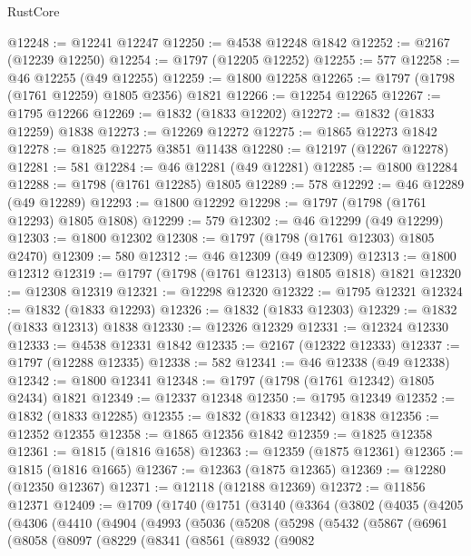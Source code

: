 \begin{lexlean}{RustCore}
\begin{coremodule}
@12248 := @12241 @12247
@12250 := @4538 @12248 @1842
@12252 := @2167 (@12239 @12250)
@12254 := @1797 (@12205 @12252)
@12255 := 577
@12258 := @46 @12255 (@49 @12255)
@12259 := @1800 @12258
@12265 := @1797 (@1798 (@1761 @12259) @1805 @2356) @1821
@12266 := @12254 @12265
@12267 := @1795 @12266
@12269 := @1832 (@1833 @12202)
@12272 := @1832 (@1833 @12259) @1838
@12273 := @12269 @12272
@12275 := @1865 @12273 @1842
@12278 := @1825 @12275 @3851 @11438
@12280 := @12197 (@12267 @12278)
@12281 := 581
@12284 := @46 @12281 (@49 @12281)
@12285 := @1800 @12284
@12288 := @1798 (@1761 @12285) @1805
@12289 := 578
@12292 := @46 @12289 (@49 @12289)
@12293 := @1800 @12292
@12298 := @1797 (@1798 (@1761 @12293) @1805 @1808)
@12299 := 579
@12302 := @46 @12299 (@49 @12299)
@12303 := @1800 @12302
@12308 := @1797 (@1798 (@1761 @12303) @1805 @2470)
@12309 := 580
@12312 := @46 @12309 (@49 @12309)
@12313 := @1800 @12312
@12319 := @1797 (@1798 (@1761 @12313) @1805 @1818) @1821
@12320 := @12308 @12319
@12321 := @12298 @12320
@12322 := @1795 @12321
@12324 := @1832 (@1833 @12293)
@12326 := @1832 (@1833 @12303)
@12329 := @1832 (@1833 @12313) @1838
@12330 := @12326 @12329
@12331 := @12324 @12330
@12333 := @4538 @12331 @1842
@12335 := @2167 (@12322 @12333)
@12337 := @1797 (@12288 @12335)
@12338 := 582
@12341 := @46 @12338 (@49 @12338)
@12342 := @1800 @12341
@12348 := @1797 (@1798 (@1761 @12342) @1805 @2434) @1821
@12349 := @12337 @12348
@12350 := @1795 @12349
@12352 := @1832 (@1833 @12285)
@12355 := @1832 (@1833 @12342) @1838
@12356 := @12352 @12355
@12358 := @1865 @12356 @1842
@12359 := @1825 @12358
@12361 := @1815 (@1816 @1658)
@12363 := @12359 (@1875 @12361)
@12365 := @1815 (@1816 @1665)
@12367 := @12363 (@1875 @12365)
@12369 := @12280 (@12350 @12367)
@12371 := @12118 (@12188 @12369)
@12372 := @11856 @12371
@12409 := @1709
    (@1740
      (@1751
        (@3140
          (@3364
            (@3802
              (@4035
                (@4205
                  (@4306
                    (@4410
                      (@4904
                        (@4993
                          (@5036
                            (@5208
                              (@5298
                                (@5432
                                  (@5867
                                    (@6961
                                      (@8058
                                        (@8097
                                          (@8229
                                            (@8341
                                              (@8561
                                                (@8932
                                                  (@9082

\end{coremodule}
\end{lexlean}
